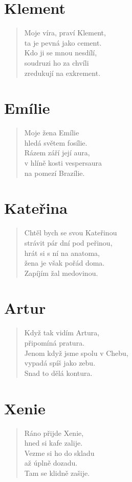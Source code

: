 \section*{Klement}
\begin{verse}
Moje víra, praví Klement,\\
ta je pevná jako cement.\\
Kdo ji se mnou nesdílí,\\
soudruzi ho za chvíli\\
zredukují na exkrement.
\end{verse}

\section*{Emílie}
\begin{verse}
Moje žena Emílie\\
hledá světem fosílie.\\
Rázem září její aura,\\
v hlíně kosti vespersaura\\
na pomezí Brazílie.
\end{verse}

\section*{Kateřina}
\begin{verse}
Chtěl bych se svou Kateřinou\\
strávit pár dní pod peřinou,\\
hrát si s ní na anatoma,\\
žena je však pořád doma.\\
Zapíjím žal medovinou.
\end{verse}

\section*{Artur}
\begin{verse}
Když tak vidím Artura,\\
připomíná pratura.\\
Jenom když jsme spolu v Chebu,\\
vypadá spíš jako zebu.\\
Snad to dělá kontura.
\end{verse}

\section*{Xenie}
\begin{verse}
Ráno přijde Xenie,\\
hned si kafe zalije.\\
Vezme si ho do skladu\\
až úplně dozadu.\\
Tam se klidně zašije.
\end{verse}

